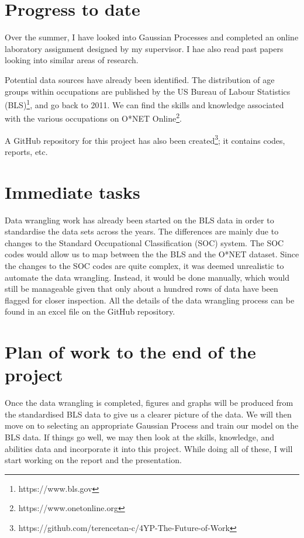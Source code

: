 \documentclass[11pt]{article}
\begin{document}
\section{Progress to date}
Over the summer, I have looked into Gaussian Processes and completed an online laboratory assignment designed by my supervisor. I hae also read past papers looking into similar areas of research.

Potential data sources have already been identified. The distribution of age groups within occupations are published by the US Bureau of Labour Statistics (BLS)\footnote{https://www.bls.gov}, and go back to 2011. We can find the skills and knowledge associated with the various occupations on O*NET Online\footnote{https://www.onetonline.org}.

A GitHub repository for this project has also been created\footnote{https://github.com/terencetan-c/4YP-The-Future-of-Work}; it contains codes, reports, etc.


  

    
  \section{Immediate tasks}
  Data wrangling work has already been started on the BLS data in order to standardise the data sets across the years. The differences are mainly due to changes to the Standard Occupational Classification (SOC) system. The SOC codes would allow us to map between the the BLS and the O*NET dataset. Since the changes to the SOC codes are quite complex, it was deemed unrealistic to automate the data wrangling. Instead, it would be done manually, which would still be manageable given that only about a hundred rows of data have been flagged for closer inspection. All the details of the data wrangling process can be found in an excel file on the GitHub repository.

  \section{Plan of work to the end of the project}
  Once the data wrangling is completed, figures and graphs will be produced from the standardised BLS data to give us a clearer picture of the data. We will then move on to selecting an appropriate Gaussian Process and train our model on the BLS data. If things go well, we may then look at the skills, knowledge, and abilities data and incorporate it into this project. While doing all of these, I will start working on the report and the presentation.




    \printbibliography[heading=bibintoc]
\end{document}
